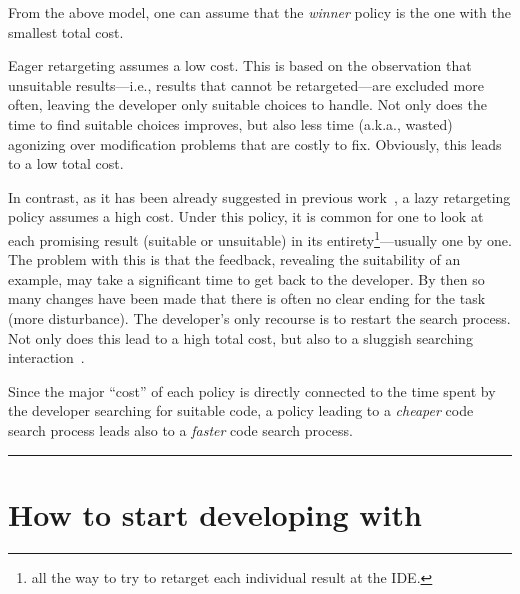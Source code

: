 From the above model, one can assume that the \emph{winner} policy is the one with the smallest total cost.

Eager retargeting assumes a low cost. This is based on the observation that unsuitable results---i.e., results that cannot be retargeted---are excluded more often, leaving the developer only suitable choices to handle. Not only does the time to find suitable choices improves, but also less time (a.k.a., wasted) agonizing over modification problems that are costly to fix. Obviously, this leads to a low total cost. 

In contrast, as it has been already suggested in previous work~\cite{Brandt:2009ew, Wightman:2012gc}, a lazy retargeting policy assumes a high cost. Under this policy, it is common for one to look at each promising result (suitable or unsuitable) in its entirety\footnote{all the way to try to retarget each individual result at the IDE.}---usually one by one. The problem with this is that the feedback, revealing the suitability of an example, may take a significant time to get back to the developer. By then so many changes have been made that there is often no clear ending for the task (more disturbance). The developer's only recourse is to restart the search process. Not only does this lead to a high total cost, but also to a sluggish searching interaction~\cite{Gray:2000im}.  

Since the major ``cost'' of each policy is directly connected to the time spent by the developer searching for suitable code, a policy leading to a \emph{cheaper} code search process leads also to a \emph{faster} code search process.

% 
% 
% 
\fancybreak{\pfbreakdisplay}

\section{How to start developing with \uppercase{\Tool}}
\label{sec:sniprscenario}


